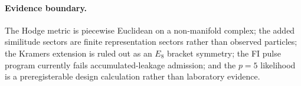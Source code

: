 \paragraph{Evidence boundary.}
The Hodge metric is piecewise Euclidean on a non-manifold complex; the added
similitude sectors are finite representation sectors rather than observed
particles; the Kramers extension is ruled out as an \(E_8\) bracket
symmetry; the FI pulse program currently fails accumulated-leakage admission;
and the \(p=5\) likelihood is a preregisterable design calculation rather
than laboratory evidence.

